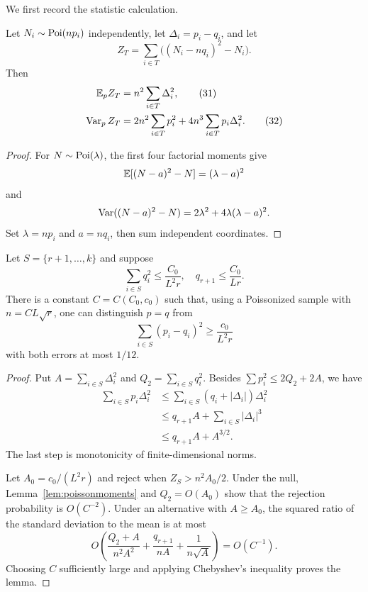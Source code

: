We first record the statistic calculation.

\begin{lemma}
\label{lem:poissonmoments}
Let $N_i\sim\operatorname{Poi}(np_i)$ independently, let $\Delta_i=p_i-q_i$, and let
\[
 Z_T=\sum_{i\in T}\big((N_i-nq_i)^2-N_i\big).
\]
Then
\begin{align}
 \mathbb E_pZ_T&=n^2\sum_{i\in T}\Delta_i^2,                    \tag{31}\label{eq:zmean}\\
 \operatorname{Var}_pZ_T&=2n^2\sum_{i\in T}p_i^2
 +4n^3\sum_{i\in T}p_i\Delta_i^2.                       \tag{32}\label{eq:zvar}
\end{align}
\end{lemma}

\begin{proof}
For $N\sim\operatorname{Poi}(\lambda)$, the first four factorial moments give
\[
 \mathbb E[(N-a)^2-N]=(\lambda-a)^2
\]
and
\[
 \operatorname{Var}((N-a)^2-N)=2\lambda^2+4\lambda(\lambda-a)^2.
\]
Set $\lambda=np_i$ and $a=nq_i$, then sum independent coordinates.
\end{proof}

\begin{lemma}
\label{lem:tailtest}
Let $S=\{r+1,\ldots,k\}$ and suppose
\[
 \sum_{i\in S}q_i^2\leq\frac{C_0}{L^2r},\quad
 q_{r+1}\leq\frac{C_0}{Lr}.
\]
There is a constant $C=C(C_0,c_0)$ such that, using a Poissonized sample with
$n=CL\sqrt r$, one can distinguish $p=q$ from
\[
 \sum_{i\in S}(p_i-q_i)^2\geq\frac{c_0}{L^2r}
\]
with both errors at most $1/12$.
\end{lemma}

\begin{proof}
Put $A=\sum_{i\in S}\Delta_i^2$ and
$Q_2=\sum_{i\in S}q_i^2$. Besides
$\sum p_i^2\leq2Q_2+2A$, we have
\begin{align*}
 \sum_{i\in S}p_i\Delta_i^2
 &\leq\sum_{i\in S}(q_i+|\Delta_i|)\Delta_i^2\\
 &\leq q_{r+1}A+\sum_{i\in S}|\Delta_i|^3\\
 &\leq q_{r+1}A+A^{3/2}.
\end{align*}
The last step is monotonicity of finite-dimensional norms.

Let $A_0=c_0/(L^2r)$ and reject when
$Z_S>n^2A_0/2$. Under the null, Lemma~\ref{lem:poissonmoments} and
$Q_2=O(A_0)$ show that the rejection probability is $O(C^{-2})$.
Under an alternative with $A\geq A_0$, the squared ratio of the standard
deviation to the mean is at most
\[
 O\left(
 \frac{Q_2+A}{n^2A^2}
 +\frac{q_{r+1}}{nA}
 +\frac1{n\sqrt A}
 \right)=O(C^{-1}).                                      \tag{33}\label{eq:snrbound}
\]
Choosing $C$ sufficiently large and applying Chebyshev's inequality proves
the lemma.
\end{proof}

